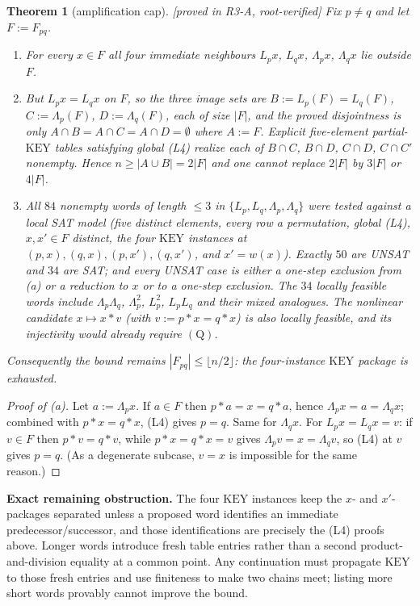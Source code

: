 \documentclass[11pt]{article}
\theoremstyle{plain}
\newtheorem{theorem}{Theorem}[section]
\theoremstyle{definition}
\theoremstyle{remark}
\numberwithin{equation}{section}
\newcommand{\op}{\mathbin{*}}
\newcommand{\statusbox}[1]{{\small\sloppy\textsf{[#1]}}}
\newcommand{\MV}[1]{\statusbox{machine-verified: \texttt{#1}}}
\newcommand{\PROVED}[1]{\statusbox{proved in #1, root-verified}}
\begin{document}
\begin{theorem}[amplification cap]\label{thm:T3cap}
\PROVED{R3-A}\;\MV{problems\slash etp677\slash r3a\_search.py}
Fix $p\ne q$ and let $F := F_{pq}$.
\begin{enumerate}
\item[(a)] For every $x\in F$ all four immediate neighbours $L_px$, $L_qx$, $\Lambda_px$,
$\Lambda_qx$ lie outside $F$.
\item[(b)] But $L_px = L_qx$ on $F$, so the three image sets are $B := L_p(F) = L_q(F)$,
$C := \Lambda_p(F)$, $D := \Lambda_q(F)$, each of size $|F|$, and the proved disjointness is
only $A\cap B = A\cap C = A\cap D = \emptyset$ where $A := F$. Explicit five-element
partial-$\mathrm{KEY}$ tables satisfying global (L4) realize each of
$B\cap C$, $B\cap D$, $C\cap D$, $C\cap C'$ nonempty. Hence $n\ge|A\cup B| = 2|F|$ and one
cannot replace $2|F|$ by $3|F|$ or $4|F|$.
\item[(c)] All $84$ nonempty words of length $\le 3$ in $\{L_p,L_q,\Lambda_p,\Lambda_q\}$ were
tested against a local SAT model (five distinct elements, every row a permutation, global
(L4), $x,x'\in F$ distinct, the four $\mathrm{KEY}$ instances at $(p,x),(q,x),(p,x'),(q,x')$,
and $x' = w(x)$). Exactly $50$ are UNSAT and $34$ are SAT; and \emph{every} UNSAT case is
either a one-step exclusion from (a) or a reduction to $x$ or to a one-step exclusion. The
$34$ locally feasible words include $\Lambda_p\Lambda_q$, $\Lambda_p^2$, $L_p^2$, $L_pL_q$ and
their mixed analogues. The nonlinear candidate $x\mapsto x\op v$ (with $v := p\op x = q\op x$)
is also locally feasible, and its injectivity would already require $(\mathrm{Q})$.
\end{enumerate}
Consequently the bound remains $|F_{pq}|\le\lfloor n/2\rfloor$: \emph{the four-instance
$\mathrm{KEY}$ package is exhausted.}
\end{theorem}

\begin{proof}[Proof of (a)]
Let $a := \Lambda_px$. If $a\in F$ then $p\op a = x = q\op a$, hence
$\Lambda_px = a = \Lambda_qx$; combined with $p\op x = q\op x$, (L4) gives $p=q$. Same for
$\Lambda_qx$. For $L_px = L_qx = v$: if $v\in F$ then $p\op v = q\op v$, while
$p\op x = q\op x = v$ gives $\Lambda_pv = x = \Lambda_qv$, so (L4) at $v$ gives $p=q$.
(As a degenerate subcase, $v=x$ is impossible for the same reason.)
\end{proof}

\textbf{Exact remaining obstruction.} The four $\mathrm{KEY}$ instances keep the $x$- and
$x'$-packages separated unless a proposed word identifies an immediate
predecessor/successor, and those identifications are precisely the (L4) proofs above. Longer
words introduce fresh table entries rather than a second product-and-division equality at a
common point. Any continuation must propagate $\mathrm{KEY}$ to those fresh entries and use
finiteness to make two chains meet; listing more short words provably cannot improve the
bound.
\end{document}
